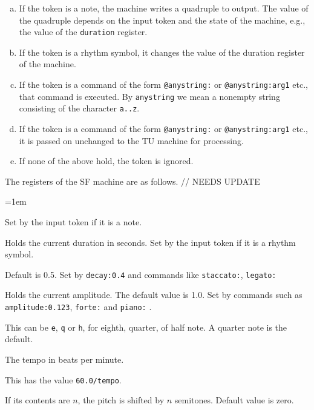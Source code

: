 \documentclass[11pt]{amsart}
\begin{document}
\begin{enumerate}[(a)]

	\item If the token is a note, the machine writes a quadruple to output.  The value of the quadruple
	depends on the input token and the state of the machine, e.g., the value of the {\tt duration} register.
	
	\item If the token is a rhythm symbol, it changes the value of the duration register of the machine.
	
	\item If the token is a command of the form {\tt @anystring:} or 
	{\tt @anystring:arg1} etc., that command is executed.  By {\tt anystring} we mean 
	a nonempty string consisting of the character {\tt a..z}.
	
	\item If the token is a command of the form {\tt @anystring:} or {\tt @anystring:arg1} etc.,
	it is passed on unchanged to the TU machine for processing.
	
	\item If none of the above hold, the token is ignored.

\end{enumerate}

The registers of the SF machine are as follows. // NEEDS UPDATE

\begin{description}
    \parskip=1em
	\item[{\tt frequency}] Set by the input token if it is a note.
	
	\item[{\tt duration}]  Holds the current duration in seconds.  Set by the input token if it
	        is a rhythm symbol.
	        
	\item[{\tt decay}] Default is 0.5. Set by {\tt decay:0.4} and commands like 
	{\tt staccato:}, {\tt legato:} 
	        
	\item[{\tt amplitude}] Holds the current amplitude.  The default value is 1.0.  Set by
	commands such as {\tt amplitude:0.123}, {\tt forte:} and {\tt piano:} .
	
	\item[{\tt beat}] This can be {\tt e}, {\tt q} or {\tt h}, for eighth, quarter, of half note.
	A quarter note is the default.
	
	\item[{\tt tempo}]  The tempo in beats per minute.  
	
	\item[{\tt beatDuration}] This has the value {\tt 60.0/tempo}.
	
	\item[{\tt transpose}]  If its contents are $n$, the pitch is shifted by
	$n$ semitones.  Default value is zero.

\end{description}
\end{document}
